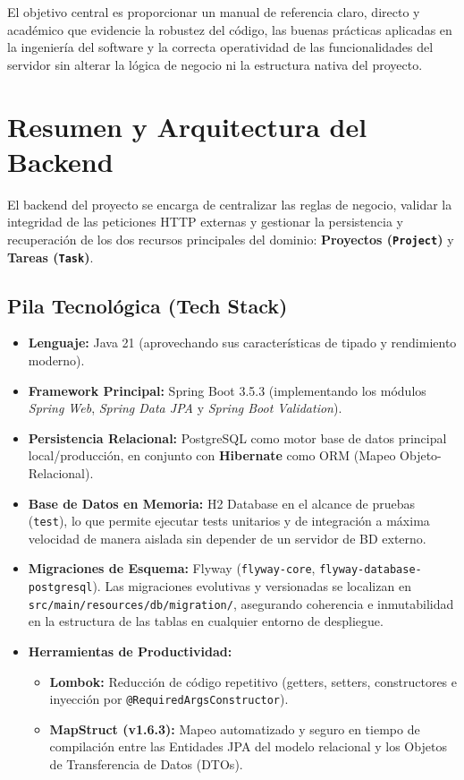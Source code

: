 \documentclass[12pt,a4paper]{article}
\begin{document}
El objetivo central es proporcionar un manual de referencia claro, directo y académico que evidencie la robustez del código, las buenas prácticas aplicadas en la ingeniería del software y la correcta operatividad de las funcionalidades del servidor sin alterar la lógica de negocio ni la estructura nativa del proyecto.

\section{Resumen y Arquitectura del Backend}
El backend del proyecto se encarga de centralizar las reglas de negocio, validar la integridad de las peticiones HTTP externas y gestionar la persistencia y recuperación de los dos recursos principales del dominio: \textbf{Proyectos (\texttt{Project})} y \textbf{Tareas (\texttt{Task})}.

\subsection{Pila Tecnológica (Tech Stack)}
\begin{itemize}
    \item \textbf{Lenguaje:} Java 21 (aprovechando sus características de tipado y rendimiento moderno).
    \item \textbf{Framework Principal:} Spring Boot 3.5.3 (implementando los módulos \textit{Spring Web}, \textit{Spring Data JPA} y \textit{Spring Boot Validation}).
    \item \textbf{Persistencia Relacional:} PostgreSQL como motor base de datos principal local/producción, en conjunto con \textbf{Hibernate} como ORM (Mapeo Objeto-Relacional).
    \item \textbf{Base de Datos en Memoria:} H2 Database en el alcance de pruebas (\texttt{test}), lo que permite ejecutar tests unitarios y de integración a máxima velocidad de manera aislada sin depender de un servidor de BD externo.
    \item \textbf{Migraciones de Esquema:} Flyway (\texttt{flyway-core}, \texttt{flyway-database-postgresql}). Las migraciones evolutivas y versionadas se localizan en \texttt{src/main/resources/db/migration/}, asegurando coherencia e inmutabilidad en la estructura de las tablas en cualquier entorno de despliegue.
    \item \textbf{Herramientas de Productividad:} 
    \begin{itemize}
        \item \textbf{Lombok:} Reducción de código repetitivo (getters, setters, constructores e inyección por \texttt{@RequiredArgsConstructor}).
        \item \textbf{MapStruct (v1.6.3):} Mapeo automatizado y seguro en tiempo de compilación entre las Entidades JPA del modelo relacional y los Objetos de Transferencia de Datos (DTOs).
    \end{itemize}
\end{itemize}
\end{document}
